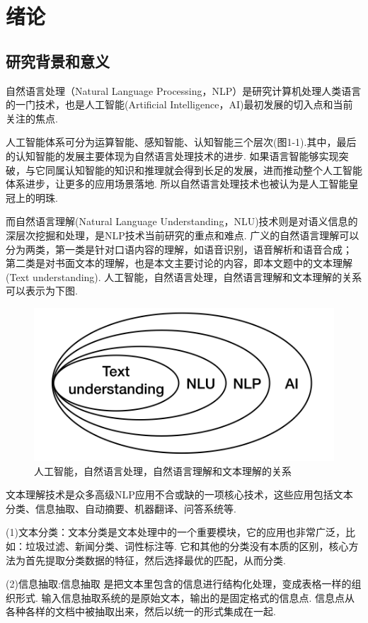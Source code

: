 \documentclass[bachelor,winfonts]{jnuthesis}
\begin{document}

\chapter{绪论}\label{chapter_introduction}
\section{研究背景和意义}
自然语言处理（Natural Language Processing，NLP）是研究计算机处理人类语言的一门技术，也是人工智能(Artificial Intelligence，AI)最初发展的切入点和当前关注的焦点.

人工智能体系可分为运算智能、感知智能、认知智能三个层次(图1-1).其中，最后的认知智能的发展主要体现为自然语言处理技术的进步.
如果语言智能够实现突破，与它同属认知智能的知识和推理就会得到长足的发展，进而推动整个人工智能体系进步，让更多的应用场景落地.
所以自然语言处理技术也被认为是人工智能皇冠上的明珠.

而自然语言理解(Natural Language Understanding，NLU)技术则是对语义信息的深层次挖掘和处理，是NLP技术当前研究的重点和难点.
广义的自然语言理解可以分为两类，第一类是针对口语内容的理解，如语音识别，语音解析和语音合成；
第二类是对书面文本的理解，也是本文主要讨论的内容，即本文题中的文本理解(Text understanding).
人工智能，自然语言处理，自然语言理解和文本理解的关系可以表示为下图.

\begin{figure}[h!]
  \centering
  \includegraphics[width=0.5\linewidth]{结构关系.png}
  \caption{人工智能，自然语言处理，自然语言理解和文本理解的关系}
\end{figure}

文本理解技术是众多高级NLP应用不合或缺的一项核心技术，这些应用包括文本分类、信息抽取、自动摘要、机器翻译、问答系统等.

(1)文本分类：文本分类是文本处理中的一个重要模块，它的应用也非常广泛，比如：垃圾过滤、新闻分类、词性标注等.
它和其他的分类没有本质的区别，核心方法为首先提取分类数据的特征，然后选择最优的匹配，从而分类.

(2)信息抽取:信息抽取 是把文本里包含的信息进行结构化处理，变成表格一样的组织形式.
输入信息抽取系统的是原始文本，输出的是固定格式的信息点.
信息点从各种各样的文档中被抽取出来，然后以统一的形式集成在一起.
\end{document}
